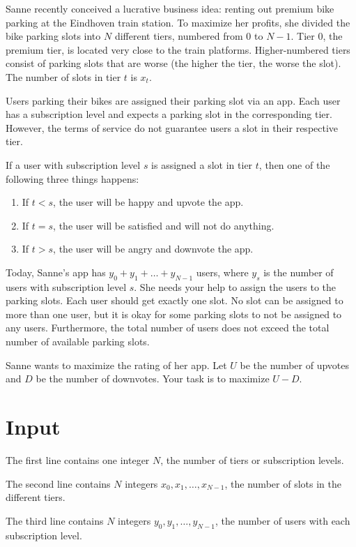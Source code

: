 
Sanne recently conceived a lucrative business idea: renting out premium bike parking at the Eindhoven train station.
To maximize her profits, she divided the bike parking slots into $N$ different tiers, numbered from $0$ to $N-1$.
Tier 0, the premium tier, is located very close to the train platforms.
Higher-numbered tiers consist of parking slots that are worse (the higher the tier, the worse the slot).
The number of slots in tier $t$ is $x_t$.

Users parking their bikes are assigned their parking slot via an app.
Each user has a subscription level and expects a parking slot in the corresponding tier.
However, the terms of service do not guarantee users a slot in their respective tier.

If a user with subscription level $s$ is assigned a slot in tier $t$, then one of the following three things happens:
\begin{enumerate}
\item If $t < s$, the user will be happy and upvote the app.
\item If $t = s$, the user will be satisfied and will not do anything.
\item If $t > s$, the user will be angry and downvote the app.
\end{enumerate}

Today, Sanne's app has $y_0+y_1+\ldots+y_{N-1}$ users, where $y_s$ is the number of users with subscription level $s$.
She needs your help to assign the users to the parking slots. Each user should get exactly one
slot. No slot can be assigned to more than one user, but it is okay for some parking slots to not be assigned to any users. Furthermore, the total number of users does not exceed the total number of available parking slots.

Sanne wants to maximize the rating of her app.
Let $U$ be the number of upvotes and $D$ be the number of downvotes.
Your task is to maximize $U-D$.

\section*{Input}
The first line contains one integer $N$, the number of tiers or subscription levels.

The second line contains $N$ integers $x_0, x_1, \ldots, x_{N-1}$,
the number of slots in the different tiers.

The third line contains $N$ integers $y_0, y_1, \ldots, y_{N-1}$,
the number of users with each subscription level.

